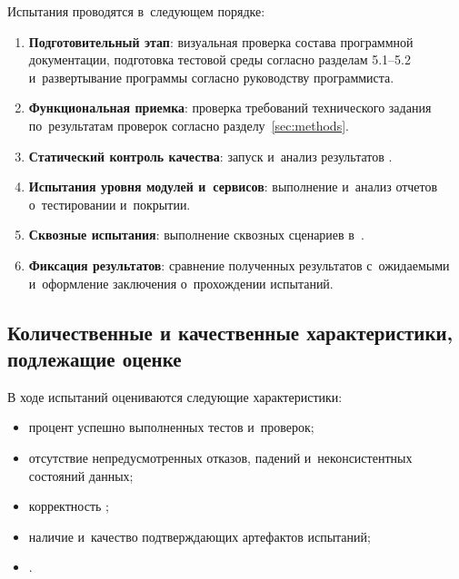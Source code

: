 \documentclass[12pt,a4paper]{extarticle}
\begin{document}
\begin{hseExample}
Испытания проводятся в~следующем порядке:

\begin{enumerate}[label=\arabic*), leftmargin=1.25cm]
    \item \textbf{Подготовительный этап}: визуальная проверка состава программной документации, подготовка тестовой среды согласно разделам 5.1--5.2 и~развертывание программы согласно руководству программиста.
    \item \textbf{Функциональная приемка}: проверка требований технического задания по~результатам проверок согласно разделу~\ref{sec:methods}.
    \item \textbf{Статический контроль качества}: запуск и~анализ результатов .
    \item \textbf{Испытания уровня модулей и~сервисов}: выполнение  и~анализ отчетов о~тестировании и~покрытии.
    \item \textbf{Сквозные испытания}: выполнение сквозных сценариев в~.
    \item \textbf{Фиксация результатов}: сравнение полученных результатов с~ожидаемыми и~оформление заключения о~прохождении испытаний.
\end{enumerate}
\end{hseExample}

\subsection{Количественные и качественные характеристики, подлежащие оценке}

\begin{hseExample}
В ходе испытаний оцениваются следующие характеристики:

\begin{itemize}[leftmargin=1.25cm]
    \item процент успешно выполненных тестов и~проверок;
    \item отсутствие непредусмотренных отказов, падений и~неконсистентных состояний данных;
    \item корректность ;
    \item наличие и~качество подтверждающих артефактов испытаний;
    \item {}.
\end{itemize}
\end{hseExample}
\end{document}
